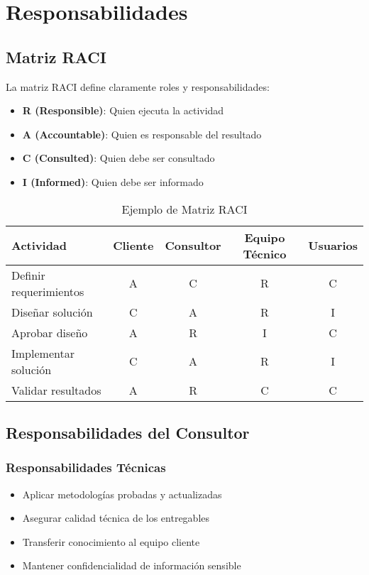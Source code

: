 \documentclass[12pt,letterpaper,oneside]{book}
\begin{document}
\section{Responsabilidades}

\subsection{Matriz RACI}

La matriz RACI define claramente roles y responsabilidades:

\begin{itemize}
\item \textbf{R (Responsible)}: Quien ejecuta la actividad
\item \textbf{A (Accountable)}: Quien es responsable del resultado
\item \textbf{C (Consulted)}: Quien debe ser consultado
\item \textbf{I (Informed)}: Quien debe ser informado
\end{itemize}

\begin{table}[H]
\centering
\caption{Ejemplo de Matriz RACI}
\begin{tabular}{|p{4cm}|c|c|c|c|}
\hline
\textbf{Actividad} & \textbf{Cliente} & \textbf{Consultor} & \textbf{Equipo Técnico} & \textbf{Usuarios} \\
\hline
Definir requerimientos & A & C & R & C \\
\hline
Diseñar solución & C & A & R & I \\
\hline
Aprobar diseño & A & R & I & C \\
\hline
Implementar solución & C & A & R & I \\
\hline
Validar resultados & A & R & C & C \\
\hline
\end{tabular}
\end{table}

\subsection{Responsabilidades del Consultor}

\subsubsection{Responsabilidades Técnicas}

\begin{itemize}
\item Aplicar metodologías probadas y actualizadas
\item Asegurar calidad técnica de los entregables
\item Transferir conocimiento al equipo cliente
\item Mantener confidencialidad de información sensible
\end{itemize}
\end{document}
